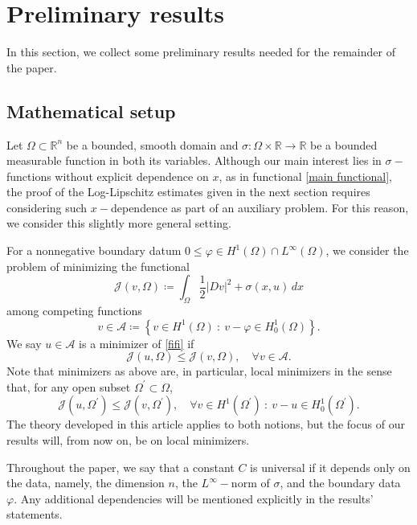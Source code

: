 \documentclass[reqno,11pt]{amsart}
\newcommand{\1}{\mathds{1}}  %
\numberwithin{equation}{section}
\begin{document}
\section{Preliminary results}\label{prelim-sect}

In this section, we collect some preliminary results needed for the remainder of the paper. 

\subsection{Mathematical setup} 

Let $\Omega \subset \mathbb{R}^n$ be a bounded, smooth domain and $\sigma \colon \Omega \times \mathbb{R} \to \mathbb{R}$ be a bounded measurable function in both its variables. Although our main interest lies in $\sigma-$functions without explicit dependence on $x$, as in functional \eqref{main functional}, the proof of the Log-Lipschitz estimates given in the next section requires considering such $x-$dependence as part of an auxiliary problem. For this reason, we consider this slightly more general setting.

For a nonnegative boundary datum $0 \leq \varphi \in H^1(\Omega) \cap L^\infty(\Omega)$, we consider the problem of minimizing the functional 
\begin{equation}\label{fifi}
	\mathcal{J}(v, \Omega) \coloneqq \int_{\Omega} \frac{1}{2} \left| Dv \right|^2 + \sigma(x,u)\,dx
\end{equation}
among competing functions 
$$
    v \in {\mathcal A} \coloneqq \left\{ v \in H^1(\Omega) \ \colon \ v-\varphi \in H_0^1(\Omega) \right\}. 
$$
We say $u \in \mathcal{A}$ is a minimizer of \eqref{fifi} if 
$$
    \mathcal{J}(u, \Omega) \leq \mathcal{J}(v, \Omega), \quad \forall v \in \mathcal{A}. 
$$
Note that minimizers as above are, in particular, local minimizers in the sense that, for any open subset $\Omega^\prime \subset \Omega$,
$$
    \mathcal{J}(u, \Omega^\prime) \leq \mathcal{J}(v, \Omega^\prime), \quad \forall v \in H^1(\Omega^\prime)\ \colon \ v-u \in H_0^1(\Omega^\prime).
$$
The theory developed in this article applies to both notions, but the focus of our results will, from now on, be on local minimizers.

Throughout the paper, we say that a constant $C$ is universal if it depends only on the data, namely, the dimension $n$, the $L^\infty-$norm of $\sigma$, and the boundary data $\varphi$. Any additional dependencies will be mentioned explicitly in the results' statements.
\end{document}
